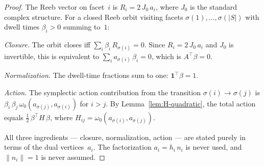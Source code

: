 \begin{proof}
The Reeb vector on facet~$i$ is
$R_i = 2\, J_0\, a_i$, where $J_0$ is the standard
complex structure.
For a closed Reeb orbit visiting facets
$\sigma(1), \ldots, \sigma(|S|)$ with dwell times
$\beta_i > 0$ summing to~$1$:

\emph{Closure.}
The orbit closes iff
$\sum_i \beta_i\, R_{\sigma(i)} = 0$.
Since $R_i = 2\, J_0\, a_i$ and $J_0$ is invertible, this is equivalent to
$\sum_i a_{\sigma(i)}\, \beta_i = 0$,
which is $A^\top \beta = 0$.

\emph{Normalization.}
The dwell-time fractions sum to one:
$\mathbf{1}^\top \beta = 1$.

\emph{Action.}
The symplectic action contribution from the transition
$\sigma(i) \to \sigma(j)$ is
$\beta_i\,\beta_j\,\omega_0(a_{\sigma(j)}, a_{\sigma(i)})$
for $i > j$.
By Lemma~\ref{lem:H-quadratic}, the total action equals
$\tfrac{1}{2}\,\beta^\top H\,\beta$,
where $H_{ij} = \omega_0(a_{\sigma(i)}, a_{\sigma(j)})$.

All three ingredients --- closure, normalization, action ---
are stated purely in terms of the dual vertices~$a_i$.
The factorization $a_i = h_i\, n_i$ is never used, and
$\|n_i\| = 1$ is never assumed.
\end{proof}


